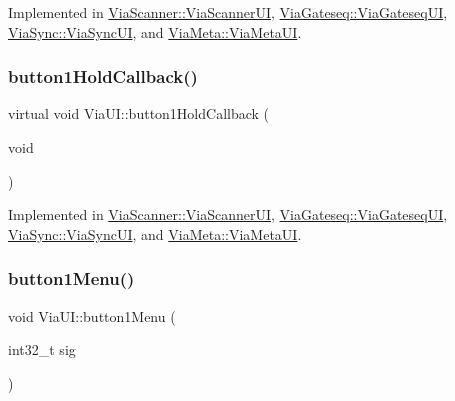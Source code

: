 Implemented in \mbox{\hyperlink{class_via_scanner_1_1_via_scanner_u_i_a10b9a54f4fb6ea88203d53041093d650}{Via\+Scanner\+::\+Via\+Scanner\+UI}}, \mbox{\hyperlink{class_via_gateseq_1_1_via_gateseq_u_i_aa4ce0e46aeda7bea4ec2a09bbca2abac}{Via\+Gateseq\+::\+Via\+Gateseq\+UI}}, \mbox{\hyperlink{class_via_sync_1_1_via_sync_u_i_a2082d2d4a5ef8cbbaa2a1d8a387b3cad}{Via\+Sync\+::\+Via\+Sync\+UI}}, and \mbox{\hyperlink{class_via_meta_1_1_via_meta_u_i_a5e9d82c9c06759dd2cc3b48846e594f2}{Via\+Meta\+::\+Via\+Meta\+UI}}.

\mbox{\label{class_via_u_i_a62145ce1c1b664ff0a1aadaac9386162}} 
\subsubsection{\texorpdfstring{button1\+Hold\+Callback()}{button1HoldCallback()}}
{\footnotesize\ttfamily virtual void Via\+U\+I\+::button1\+Hold\+Callback (\begin{DoxyParamCaption}\item[{void}]{ }\end{DoxyParamCaption})\hspace{0.3cm}{\ttfamily [pure virtual]}}



Implemented in \mbox{\hyperlink{class_via_scanner_1_1_via_scanner_u_i_a8d7608e430d6be2777f4fb76b4ea9f2b}{Via\+Scanner\+::\+Via\+Scanner\+UI}}, \mbox{\hyperlink{class_via_gateseq_1_1_via_gateseq_u_i_a4123b11e47b7dc36bba9041fa3635e84}{Via\+Gateseq\+::\+Via\+Gateseq\+UI}}, \mbox{\hyperlink{class_via_sync_1_1_via_sync_u_i_acd1a12bdb9cc39045eee719af6d70d1c}{Via\+Sync\+::\+Via\+Sync\+UI}}, and \mbox{\hyperlink{class_via_meta_1_1_via_meta_u_i_a601890a2c65f53fc575c9ef211fcfeaa}{Via\+Meta\+::\+Via\+Meta\+UI}}.

\mbox{\label{class_via_u_i_ae921a22294017c3a1aa3e670d30768a1}} 
\subsubsection{\texorpdfstring{button1\+Menu()}{button1Menu()}}
{\footnotesize\ttfamily void Via\+U\+I\+::button1\+Menu (\begin{DoxyParamCaption}\item[{int32\+\_\+t}]{sig }\end{DoxyParamCaption})}

